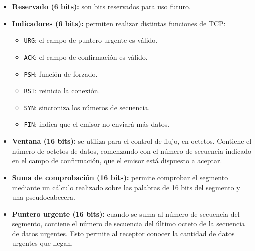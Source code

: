 \documentclass[11pt,a4paper]{article}
\begin{document}
\begin{enumerate}
\begin{enumerate}
\begin{itemize}
    \item \textbf{Reservado (6 bits):} son bits reservados para uso futuro.

    \item \textbf{Indicadores (6 bits):} permiten realizar distintas funciones de TCP:
    \begin{itemize}
        \item \texttt{URG}: el campo de puntero urgente es válido.
        \item \texttt{ACK}: el campo de confirmación es válido.
        \item \texttt{PSH}: función de forzado.
        \item \texttt{RST}: reinicia la conexión.
        \item \texttt{SYN}: sincroniza los números de secuencia.
        \item \texttt{FIN}: indica que el emisor no enviará más datos.
    \end{itemize}

    \item \textbf{Ventana (16 bits):} se utiliza para el control de flujo, en octetos. Contiene el número de octetos de datos, comenzando con el número de secuencia indicado en el campo de confirmación, que el emisor está dispuesto a aceptar.

    \item \textbf{Suma de comprobación (16 bits):} permite comprobar el segmento mediante un cálculo realizado sobre las palabras de 16 bits del segmento y una pseudocabecera.

    \item \textbf{Puntero urgente (16 bits):} cuando se suma al número de secuencia del segmento, contiene el número de secuencia del último octeto de la secuencia de datos urgentes. Esto permite al receptor conocer la cantidad de datos urgentes que llegan.


\end{itemize}
\end{enumerate}
\end{enumerate}
\end{document}
